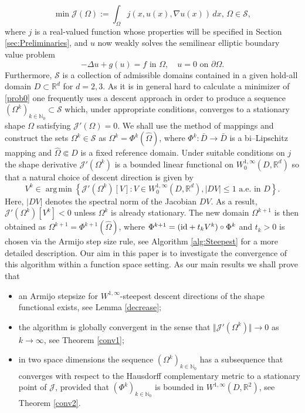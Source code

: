 \documentclass[a4paper,10pt]{article}
\newcommand{\dx}{\,dx}
\newcommand{\Omref}{\hat \Omega}
\theoremstyle{plain}
\theoremstyle{plain}
\numberwithin{equation}{section}
\DeclareMathOperator*{\argmin}{arg\,min}
\begin{document}
\begin{equation}\label{prob0}
    \min \mathcal{J}(\Omega):= \int_\Omega j(x, u(x),\nabla u(x))  \dx,\, \Omega \in \mathcal{S},
\end{equation}
where $j$ is a real-valued function whose properties will be specified in Section \ref{sec:Preliminaries}, and $u$ now weakly solves the semilinear elliptic boundary value problem
\[
-\Delta u + g(u) =f \text{ in } \Omega, \quad u=0 \text{ on } \partial \Omega.
\]
Furthermore, $\mathcal{S}$ is a collection of admissible domains contained in a given hold-all domain $D \subset \mathbb R^d$ for $d=2,3$. As it is in general hard to calculate a minimizer of \eqref{prob0} one frequently uses
a descent approach in order to produce a sequence $(\Omega^k)_{k \in \mathbb N_0} \subset \mathcal S$
which, under appropriate conditions, converges to a stationary shape $\Omega$ satisfying $\mathcal J'(\Omega)=0$. We shall use the method of mappings and construct the sets $\Omega^k \in \mathcal S$ 
as $\Omega^k=\Phi^k(\Omref)$, where $\Phi^k\colon \bar D \rightarrow \bar D$ is a bi--Lipschitz mapping  and $\Omref \Subset D$ is a fixed reference domain. Under suitable conditions on $j$ the shape derivative
$\mathcal J'(\Omega^k)$ is a bounded linear functional on $W^{1,\infty}_0(D,\mathbb R^d)$ so that
a natural choice of descent direction is given by 
\begin{equation}\label{eq:generalMinimisationForDirection}
    V^k \in \argmin \left\{  \mathcal{J}'(\Omega^k)[V] :  V\in  W^{1,\infty}_0(D,\mathbb R^d), | D V | \leq 1 \mbox{ a.e. in } D \right\}.
\end{equation}
Here, $|DV|$ denotes the spectral norm of the Jacobian $DV$. As a result, $\mathcal{J}'(\Omega^k)[V^k]<0$ unless $\Omega^k$ is already stationary. 
The new domain $\Omega^{k+1}$ is then obtained as $\Omega^{k+1} = \Phi^{k+1}(\Omref)$, where $\Phi^{k+1} = ({\rm id} + t_k V^k)\circ \Phi^k$ and $t_k>0$ is chosen via the Armijo step size rule, see Algorithm \ref{alg:Steepest}
for a more detailed description. 
Our aim in this paper is to investigate the convergence of this algorithm within a function
space setting. As our main results we shall prove that
\begin{itemize}
\item an Armijo stepsize for $W^{1,\infty}$-steepest descent directions of the shape functional exists, see Lemma \ref{decrease};
\item the algorithm is globally convergent in the sense that $\Vert \mathcal J'(\Omega^k) \Vert \rightarrow 0$ as $k \rightarrow \infty$, see Theorem \ref{conv1};
\item in two space dimensions the sequence $(\Omega^k)_{k \in \mathbb N_0}$ has a subsequence
that converges with respect to the Hausdorff complementary metric to a stationary point of $\mathcal J$,
provided that $(\Phi^k)_{k \in \mathbb N_0}$ is bounded in $W^{1,\infty}(D,\mathbb R^2)$, see Theorem \ref{conv2}. 
\end{itemize}
\end{document}
